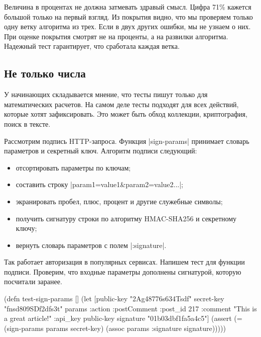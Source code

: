 Величина в процентах не должна затмевать здравый смысл. Цифра 71\% кажется
большой только на первый взгляд. Из покрытия видно, что мы проверяем только одну
ветку алгоритма из трех. Если в двух других ошибки, мы не узнаем о них. При
оценке покрытия смотрят не на проценты, а на развилки алгоритма. Надежный тест
гарантирует, что сработала каждая ветка.

\subsection{Не только числа}

У начинающих складывается мнение, что тесты пишут только для математических
расчетов. На самом деле тесты подходят для всех действий, которые хотят
зафиксировать. Это может быть обход коллекции, криптография, поиск в тексте.

Рассмотрим подпись HTTP-запроса. Функция \spverb|sign-params| принимает словарь
параметров и секретный ключ. Алгоритм подписи следующий:

\begin{itemize}


\item
  отсортировать параметры по ключам;

\item
  составить строку \spverb|param1=value1&param2=value2...|;

\item
  экранировать пробел, плюс, процент и другие служебные символы;

\item
  получить сигнатуру строки по алгоритму HMAC-SHA256 и секретному ключу;

\item
  вернуть словарь параметров с полем \spverb|:signature|.

\end{itemize}


Так работает авторизация в популярных сервисах. Напишем тест для функции
подписи. Проверим, что входные параметры дополнены сигнатурой, которую посчитали
заранее.

\begin{english}
  \begin{clojure}
(defn test-sign-params []
  (let [public-key "2Ag48776s634Tsdf"
        secret-key "fnsd809SDf2dfs3t"
        params {:action :postComment
                :post_id 217
                :comment "This is a great article!"
                :api_key public-key}
        signature "01b03dbf1fa5a4c5"]
    (assert (= (sign-params params secret-key)
               (assoc params :signature signature)))))
  \end{clojure}
\end{english}

